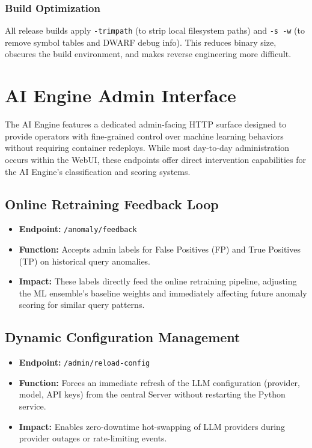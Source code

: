 \subsubsection{Build Optimization}
All release builds apply \texttt{-trimpath} (to strip local filesystem paths) and \texttt{-s -w} (to remove symbol tables and DWARF debug info). This reduces binary size, obscures the build environment, and makes reverse engineering more difficult.

\clearpage
\section{AI Engine Admin Interface}

The AI Engine features a dedicated admin-facing HTTP surface designed to provide operators with fine-grained control over machine learning behaviors without requiring container redeploys. While most day-to-day administration occurs within the WebUI, these endpoints offer direct intervention capabilities for the AI Engine's classification and scoring systems.

\subsection{Online Retraining Feedback Loop}
\begin{itemize}
    \item \textbf{Endpoint:} \texttt{/anomaly/feedback}
    \item \textbf{Function:} Accepts admin labels for False Positives (FP) and True Positives (TP) on historical query anomalies.
    \item \textbf{Impact:} These labels directly feed the online retraining pipeline, adjusting the ML ensemble's baseline weights and immediately affecting future anomaly scoring for similar query patterns.
\end{itemize}

\subsection{Dynamic Configuration Management}
\begin{itemize}
    \item \textbf{Endpoint:} \texttt{/admin/reload-config}
    \item \textbf{Function:} Forces an immediate refresh of the LLM configuration (provider, model, API keys) from the central Server without restarting the Python service.
    \item \textbf{Impact:} Enables zero-downtime hot-swapping of LLM providers during provider outages or rate-limiting events.
\end{itemize}

